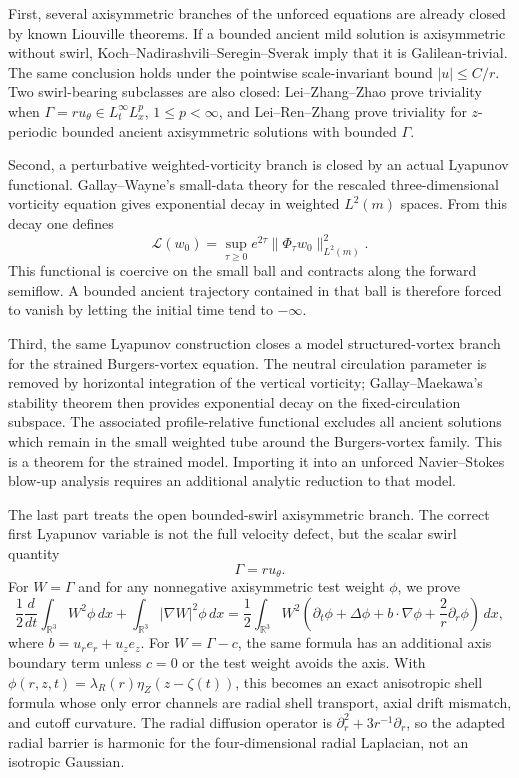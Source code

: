 \documentclass[11pt]{amsart}
\theoremstyle{plain}
\theoremstyle{definition}
\theoremstyle{remark}
\numberwithin{equation}{section}
\begin{document}
First, several axisymmetric branches of the unforced equations are already
closed by known Liouville theorems.  If a bounded ancient mild solution is
axisymmetric without swirl, Koch--Nadirashvili--Seregin--Sverak imply that it
is Galilean-trivial.  The same conclusion holds under the pointwise
scale-invariant bound \(|u|\le C/r\).  Two swirl-bearing subclasses are also
closed: Lei--Zhang--Zhao prove triviality when
\(\Gamma=ru_\theta\in L_t^\infty L_x^p\), \(1\le p<\infty\), and
Lei--Ren--Zhang prove triviality for \(z\)-periodic bounded ancient
axisymmetric solutions with bounded \(\Gamma\).

Second, a perturbative weighted-vorticity branch is closed by an actual
Lyapunov functional.  Gallay--Wayne's small-data theory for the rescaled
three-dimensional vorticity equation gives exponential decay in weighted
\(L^2(m)\) spaces.  From this decay one defines
\[
   \mathcal L(w_0)=\sup_{\tau\ge0}e^{2\tau}\|\Phi_\tau w_0\|_{L^2(m)}^2 .
\]
This functional is coercive on the small ball and contracts along the forward
semiflow.  A bounded ancient trajectory contained in that ball is therefore
forced to vanish by letting the initial time tend to \(-\infty\).

Third, the same Lyapunov construction closes a model structured-vortex branch
for the strained Burgers-vortex equation.  The neutral circulation parameter is
removed by horizontal integration of the vertical vorticity; Gallay--Maekawa's
stability theorem then provides exponential decay on the fixed-circulation
subspace.  The associated profile-relative functional excludes all ancient
solutions which remain in the small weighted tube around the Burgers-vortex
family.  This is a theorem for the strained model.  Importing it into an
unforced Navier--Stokes blow-up analysis requires an additional analytic
reduction to that model.

The last part treats the open bounded-swirl axisymmetric branch.  The correct
first Lyapunov variable is not the full velocity defect, but the scalar swirl
quantity
\[
   \Gamma=ru_\theta .
\]
For \(W=\Gamma\) and for any nonnegative axisymmetric test weight \(\phi\), we
prove
\begin{equation}\label{eq:intro-gamma}
   \frac12\frac{d}{dt}\int_{\mathbb R^3}W^2\phi\,dx
   +\int_{\mathbb R^3}|\nabla W|^2\phi\,dx
   =
   \frac12\int_{\mathbb R^3}W^2
   \left(
      \partial_t\phi+\Delta\phi+b\cdot\nabla\phi+\frac2r\partial_r\phi
   \right)\,dx,
\end{equation}
where \(b=u_r e_r+u_z e_z\).  For \(W=\Gamma-c\), the same formula has an
additional axis boundary term unless \(c=0\) or the test weight avoids the
axis.  With
\(\phi(r,z,t)=\lambda_R(r)\eta_Z(z-\zeta(t))\), this becomes an exact
anisotropic shell formula whose only error channels are radial shell transport,
axial drift mismatch, and cutoff curvature.  The radial diffusion operator is
\(\partial_r^2+3r^{-1}\partial_r\), so the adapted radial barrier is harmonic
for the four-dimensional radial Laplacian, not an isotropic Gaussian.
\end{document}
